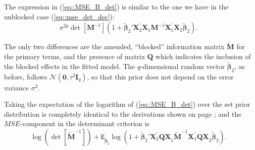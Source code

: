 The expression in (\ref{eq::MSE_B_det}) is similar to the one we have in the unblocked case (\ref{eq::mse_det_dec}):
\begin{equation*}
\sigma^{2p}\det[\bm{M}^{-1}](1+\bm{\tilde{\beta}}_2'\bm{X}_2^{'}\bm{X}_1\bm{M}^{-1}\bm{X}_1^{'}\bm{X}_2\bm{\tilde{\beta}}_2).
\end{equation*}

The only two differences are the amended, ``blocked'' information matrix $\bm{\tilde{M}}$ for the primary terms, and the presence of matrix $\bm{Q}$ which indicates the inclusion of the blocked effects in the fitted model. The $q$-dimensional random vector $\bm{\tilde{\beta}}_2$, as before, follows $\mathcal{N}(\bm{0},\tau^{2}\bm{I}_{q})$, so that this prior does not depend on the error variance $\sigma_{.}^2$.

Taking the expectation of the logarithm of (\ref{eq::MSE_B_det}) over the set prior distribution is completely identical to the derivations shown on page \pageref{eq::mse_det_dec}; and the $MSE$-component in the determinant criterion is
\begin{equation}
\label{eq::mse_b_component}
\log(\det[\bm{\tilde{M}}^{-1}])+\mathtt{E}_{\bm{\tilde{\beta}}_2}\log(1+\bm{\tilde{\beta}}_2'\bm{X}_2^{'}\bm{QX}_1\bm{\tilde{M}}^{-1}\bm{X}_1^{'}\bm{QX}_2\bm{\tilde{\beta}}_2).
\end{equation}

